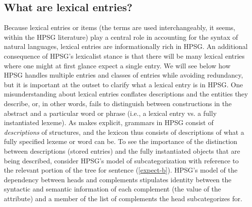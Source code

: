 \documentclass[output=paper]{langsci/langscibook}
\begin{document}
\subsection{What are lexical entries?}

Because lexical entries or items (the terms are used interchangeably, it seems, within the HPSG literature) play a central role in accounting for the syntax of natural languages, lexical entries are informationally rich in HPSG. 
An additional consequence of HPSG's lexicalist stance is that there will be many lexical entries where one might at first glance expect a single entry. We will see below how HPSG handles multiple entries and classes of entries while avoiding redundancy, but it is important at the outset to clarify what a lexical entry is in HPSG. 
One misunderstanding about lexical entries conflates descriptions and the entities they describe, or, in other words, fails to distinguish between constructions in the abstract and a particular word or phrase (i.e., a lexical entry vs. a fully instantiated lexeme). 
As  makes explicit, grammars in HPSG consist of \emph{descriptions} of structures, and the lexicon thus consists of descriptions of what a fully specified lexeme or word can be. 
To see the importance of the distinction between descriptions (stored entries) and the fully instantiated objects that are being described, consider HPSG's model of subcategorization with reference to the relevant portion of the tree for sentence (\ref{expect-b}). 
HPSG's model of the dependency between heads and complements stipulates identity between the syntactic and semantic information of each complement (the value of the  attribute) and a member of the list of complements the head subcategorizes for. 
\end{document}

